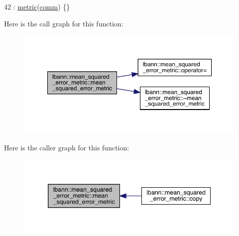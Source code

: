 \begin{DoxyCode}
42 : \hyperlink{classlbann_1_1metric_a3cd2d4f7dcbf94f70b3b8560a3171d9d}{metric}(\hyperlink{file__io_8cpp_ab048c6f9fcbcfaa57ce68b00263dbebe}{comm}) \{\}
\end{DoxyCode}
Here is the call graph for this function\+:\nopagebreak
\begin{figure}[H]
\begin{center}
\leavevmode
\includegraphics[width=350pt]{classlbann_1_1mean__squared__error__metric_ae8a430d4cb0b350606839ea7b9eda69d_cgraph}
\end{center}
\end{figure}
Here is the caller graph for this function\+:\nopagebreak
\begin{figure}[H]
\begin{center}
\leavevmode
\includegraphics[width=346pt]{classlbann_1_1mean__squared__error__metric_ae8a430d4cb0b350606839ea7b9eda69d_icgraph}
\end{center}
\end{figure}
\mbox{\label{classlbann_1_1mean__squared__error__metric_a9230a3b901252e95a58f4bea98861bd7}} 
